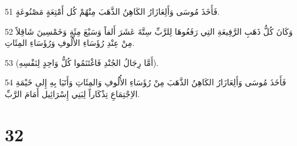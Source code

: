 \par 51 فَأَخَذَ مُوسَى وَأَلِعَازَارُ الكَاهِنُ الذَّهَبَ مِنْهُمْ كُل أَمْتِعَةٍ مَصْنُوعَةٍ.
\par 52 وَكَانَ كُلُّ ذَهَبِ الرَّفِيعَةِ التِي رَفَعُوهَا لِلرَّبِّ سِتَّةَ عَشَرَ أَلفاً وَسَبْعَ مِئَةٍ وَخَمْسِينَ شَاقِلاً مِنْ عِنْدِ رُؤَسَاءِ الأُلُوفِ وَرُؤَسَاءِ المِئَاتِ.
\par 53 (أَمَّا رِجَالُ الجُنْدِ فَاغْتَنَمُوا كُلُّ وَاحِدٍ لِنَفْسِهِ).
\par 54 فَأَخَذَ مُوسَى وَأَلِعَازَارُ الكَاهِنُ الذَّهَبَ مِنْ رُؤَسَاءِ الأُلُوفِ وَالمِئَاتِ وَأَتَيَا بِهِ إِلى خَيْمَةِ الاِجْتِمَاعِ تِذْكَاراً لِبَنِي إِسْرَائِيل أَمَامَ الرَّبِّ.

\chapter{32}


